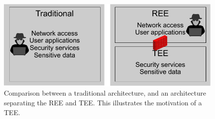 \begin{figure}[htpb]
  \centering
  \includegraphics[width=0.8\linewidth]{figures/TEE-motivation.pdf}
  \caption{Comparison between a traditional architecture, and an architecture separating the REE and TEE\@. This illustrates the motivation of a TEE\@.}\label{fig:tee_motivation}
\end{figure}
